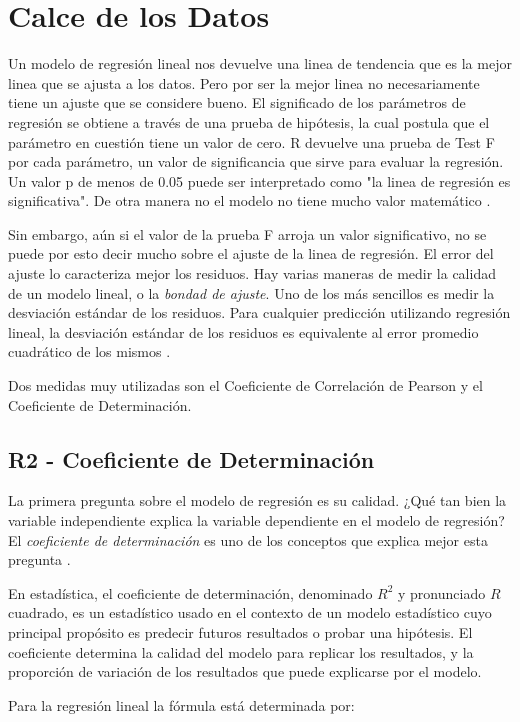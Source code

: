\documentclass[letterpaper, spanish, 11pt]{report}
\begin{document}
\section{Calce de los Datos}
Un modelo de regresión lineal nos devuelve una linea de tendencia que es la mejor linea que se ajusta a los datos. Pero por ser la mejor linea no necesariamente tiene un ajuste que se considere bueno. El significado de los parámetros de regresión se obtiene a través de una prueba de hipótesis, la cual postula que el parámetro en cuestión tiene un valor de cero. R devuelve una prueba de Test F por cada parámetro, un valor de significancia que sirve para evaluar la regresión. Un valor p de menos de 0.05 puede ser interpretado como "la linea de regresión es significativa". De otra manera no el modelo no tiene mucho valor matemático \cite{daroczi}.

Sin embargo, aún si el valor de la prueba F arroja un valor significativo, no se puede por esto decir mucho sobre el ajuste de la linea de regresión. El error del ajuste lo caracteriza mejor los residuos. Hay varias maneras de medir la calidad de un modelo lineal, o la \emph{bondad de ajuste}. Uno de los más sencillos es medir la desviación estándar de los residuos. Para cualquier predicción utilizando regresión lineal, la desviación estándar de los residuos es equivalente al error promedio cuadrático de los mismos \cite{thinkStats}.

Dos medidas muy utilizadas son el Coeficiente de Correlación de Pearson y el Coeficiente de Determinación.

\subsection{R2 - Coeficiente de Determinación}
La primera pregunta sobre el modelo de regresión es su calidad. ¿Qué tan bien la variable independiente explica la variable dependiente en el modelo de regresión? El \emph{coeficiente de determinación} es uno de los conceptos que explica mejor esta pregunta \cite{intoStats7}.

En estadística, el coeficiente de determinación, denominado $R^2$ y pronunciado $R$ cuadrado, es un estadístico usado en el contexto de un modelo estadístico cuyo principal propósito es predecir futuros resultados o probar una hipótesis. El coeficiente determina la calidad del modelo para replicar los resultados, y la proporción de variación de los resultados que puede explicarse por el modelo.

Para la regresión lineal la fórmula está determinada por:
\end{document}

